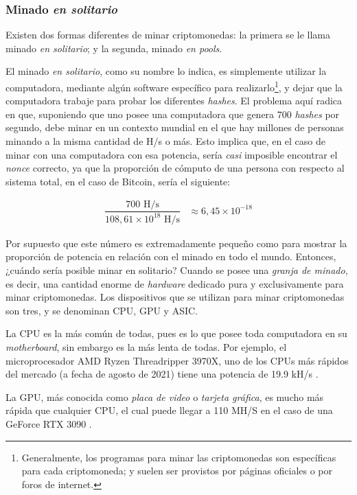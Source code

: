 \documentclass[12pt,a4paper,twoside]{book}
\begin{document}
\subsubsection{Minado \textit{en solitario}}
Existen dos formas diferentes de minar criptomonedas: la primera se le llama minado \textit{en solitario}; y la segunda, minado \textit{en pools}.

El minado \textit{en solitario}, como su nombre lo indica, es simplemente utilizar la computadora, mediante algún software específico para realizarlo\footnote{Generalmente, los programas para minar las criptomonedas son específicas para cada criptomoneda; y suelen ser provistos por páginas oficiales o por foros de internet.}, y dejar que la computadora trabaje para probar los diferentes \textit{hashes}. El problema aquí radica en que, suponiendo que uno posee una computadora que genera 700 \textit{hashes} por segundo, debe minar en un contexto mundial en el que hay millones de personas minando a la misma cantidad de H/s o más. Esto implica que, en el caso de minar con una computadora con esa potencia, sería \textit{casi} imposible encontrar el \textit{nonce} correcto, ya que la proporción de cómputo de una persona con respecto al sistema total, en el caso de Bitcoin, sería el siguiente:

\begin{align*}
\dfrac{700 \text{ H/s}}{108,61 \times 10^{18}\text{ H/s}}  &\approx 6,45 \times 10^{-18}
\end{align*}

Por supuesto que este número es extremadamente pequeño como para mostrar la proporción de potencia en relación con el minado en todo el mundo. Entonces, ¿cuándo sería posible minar en solitario? Cuando se posee una \textit{granja de minado}, es decir, una cantidad enorme de \textit{hardware} dedicado pura y exclusivamente para minar criptomonedas. Los dispositivos que se utilizan para minar criptomonedas son tres, y se denominan CPU, GPU y ASIC.

La CPU es la más común de todas, pues es lo que posee toda computadora en su \textit{motherboard}, sin embargo es la más lenta de todas. Por ejemplo, el microprocesador AMD Ryzen Threadripper 3970X, uno de los CPUs más rápidos del mercado (a fecha de agosto de 2021) tiene una potencia de 19.9 kH/s \cite{minado:cpu}.

La GPU, más conocida como \textit{placa de video} o \textit{tarjeta gráfica}, es mucho más rápida que cualquier CPU, el cual puede llegar a 110 MH/S en el caso de una GeForce RTX 3090 \cite{minado:gpuasic}.
\end{document}
